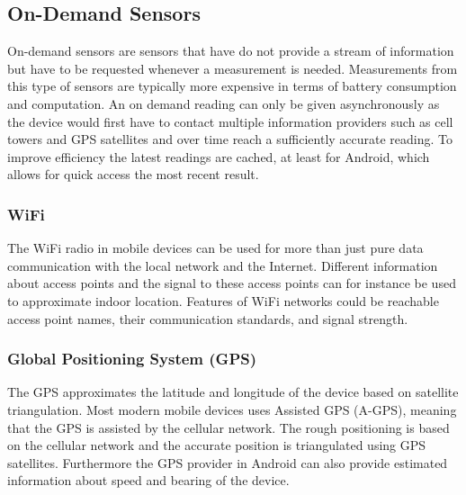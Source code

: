 \subsection{On-Demand Sensors}
On-demand sensors are sensors that have do not provide a stream of information but have to be requested whenever a measurement is needed. Measurements from this type of sensors are typically more expensive in terms of battery consumption and computation. An on demand reading can only be given asynchronously as the device would first have to contact multiple information providers such as cell towers and GPS satellites and over time reach a sufficiently accurate reading. To improve efficiency the latest readings are cached, at least for Android, which allows for quick access the most recent result.

\subsubsection{WiFi}
The WiFi radio in mobile devices can be used for more than just pure data communication with the local network and the Internet. Different information about access points and the signal to these access points can for instance be used to approximate indoor location.  
Features of WiFi networks could be reachable access point names, their communication standards, and signal strength. 

\subsubsection{Global Positioning System (GPS)}
The GPS approximates the latitude and longitude of the device based on satellite triangulation. Most modern mobile devices uses Assisted GPS (A-GPS), meaning that the GPS is assisted by the cellular network. The rough positioning is based on the cellular network and the accurate position is triangulated using GPS satellites. Furthermore the GPS provider in Android can also provide estimated information about speed and bearing of the device.

